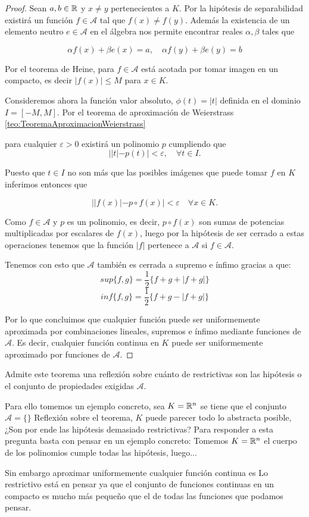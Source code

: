 \begin{proof}
    Sean $a, b \in \mathbb{R}$ y $x \neq y$ pertenecientes a $K$.  Por la hipótesis de separabilidad existirá un función $f \in \mathcal{A}$ tal que $f(x) \neq f(y)$.  Además la existencia de un elemento neutro 
    $e \in \mathcal{A}$ en el álgebra nos permite encontrar reales $\alpha, \beta$ tales que 

    $$\alpha f(x) + \beta e(x) = a, \quad \alpha f(y) + \beta e(y) = b$$  

     Por el teorema de Heine, para $f \in \mathcal A$ está acotada por tomar imagen en un compacto, es decir $|f(x)| \leq M$ para $x \in K.$  

    Consideremos ahora la función valor absoluto, $\phi(t)=|t|$ definida en el dominio $I = [-M, M].$
    Por el teorema de aproximación de Weierstrass 
    \ref{teo:TeoremaAproximacionWeierstrass}
    
    para cualquier $\varepsilon > 0$ 
    existirá un polinomio $p$ cumpliendo que 
    $$||t|- p(t)| < \varepsilon, \quad \forall t \in I.$$

    Puesto que $t \in I$ no son más que las posibles imágenes que puede tomar $f$ en $K$ inferimos entonces que 

    $$||f(x)| - p \circ f(x)| < \varepsilon \quad \forall x \in K.$$

    Como $f \in \mathcal{A}$ y $p$ es un polinomio, es decir,  $p \circ f(x)$ son sumas de potencias multiplicadas por escalares de $f(x)$, luego por la hipótesis de ser cerrado a estas operaciones tenemos que la función 
    $|f|$ pertenece a $\mathcal{A}$ si $f \in \mathcal{A}.$  


    Tenemos con esto que $\mathcal{A}$ también es cerrada a supremo e ínfimo  gracias a que:   
    $$sup\{f,g\} = \frac{1}{2} \{f+g+ |f+g|\}$$
    $$inf\{f,g\} = \frac{1}{2} \{f+g -|f+g|\}$$
    
    Por lo que concluimos que cualquier función puede ser uniformemente aproximada por combinaciones lineales, supremos e ínfimo mediante funciones de $\mathcal{A}$.   Es decir, cualquier función continua en $K$
    puede ser uniformemente aproximado por funciones de $\mathcal{A}$. 
\end{proof}

Admite este teorema una reflexión sobre cuánto de restrictivas son las hipótesis
 o el conjunto de propiedades exigidas $\mathcal{A}$. 

Para ello tomemos un ejemplo concreto, sea $K =  \mathbb{R}^n$ se tiene que el conjunto 
$\mathcal{ A} = \{ \}$
Reflexión sobre el teorema, $K$ puede parecer todo lo abstracta posible, ¿Son por ende las 
hipótesis demasiado restrictivas?  Para responder a esta pregunta basta con pensar en un ejemplo concreto: 
Tomemos $K =  \mathbb{R}^n$  el cuerpo de los polinomios cumple todas las hipótesis, luego... 

Sin embargo aproximar uniformemente cualquier función continua es 
Lo restrictivo está en pensar ya que el conjunto de funciones continuas en un compacto es mucho  más pequeño que el de todas las funciones que podamos pensar.  

\endinput